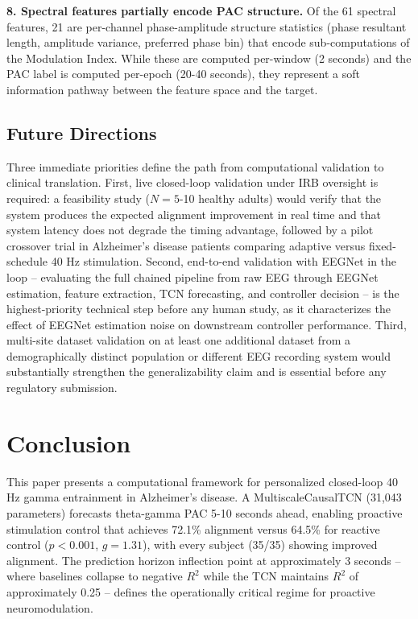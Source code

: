 \documentclass[11pt,letterpaper]{article}
\begin{document}
\textbf{8. Spectral features partially encode PAC structure.} Of the 61 spectral features, 21 are per-channel phase-amplitude structure statistics (phase resultant length, amplitude variance, preferred phase bin) that encode sub-computations of the Modulation Index. While these are computed per-window (2 seconds) and the PAC label is computed per-epoch (20-40 seconds), they represent a soft information pathway between the feature space and the target.

\subsection{Future Directions}

Three immediate priorities define the path from computational validation to clinical translation. First, live closed-loop validation under IRB oversight is required: a feasibility study ($N = 5$-10 healthy adults) would verify that the system produces the expected alignment improvement in real time and that system latency does not degrade the timing advantage, followed by a pilot crossover trial in Alzheimer's disease patients comparing adaptive versus fixed-schedule 40 Hz stimulation. Second, end-to-end validation with EEGNet in the loop -- evaluating the full chained pipeline from raw EEG through EEGNet estimation, feature extraction, TCN forecasting, and controller decision -- is the highest-priority technical step before any human study, as it characterizes the effect of EEGNet estimation noise on downstream controller performance. Third, multi-site dataset validation on at least one additional dataset from a demographically distinct population or different EEG recording system would substantially strengthen the generalizability claim and is essential before any regulatory submission.

\section{Conclusion}

This paper presents a computational framework for personalized closed-loop 40 Hz gamma entrainment in Alzheimer's disease. A MultiscaleCausalTCN (31,043 parameters) forecasts theta-gamma PAC 5-10 seconds ahead, enabling proactive stimulation control that achieves 72.1\% alignment versus 64.5\% for reactive control ($p < 0.001$, $g = 1.31$), with every subject (35/35) showing improved alignment. The prediction horizon inflection point at approximately 3 seconds -- where baselines collapse to negative $R^2$ while the TCN maintains $R^2$ of approximately 0.25 -- defines the operationally critical regime for proactive neuromodulation.
\end{document}
